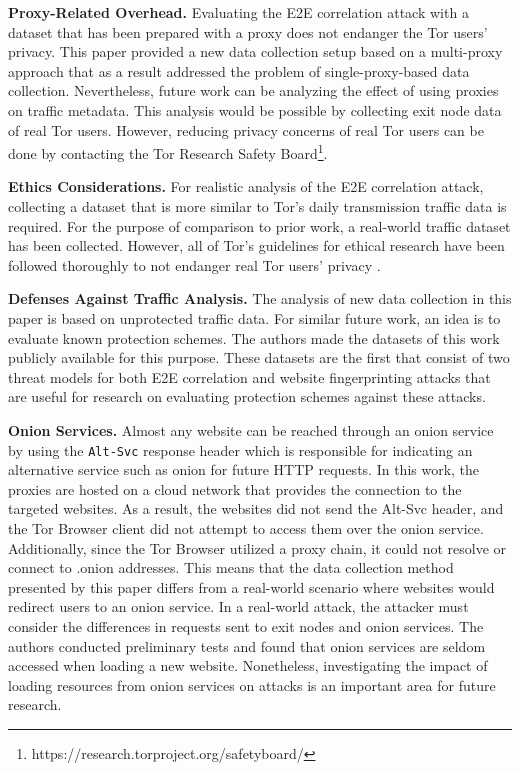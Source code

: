 \documentclass[sigconf]{acmart}
\begin{document}
\vspace{3mm}

\textbf{Proxy-Related Overhead.} Evaluating the E2E correlation attack with a dataset that has been prepared with a proxy does not endanger the Tor users' privacy. This paper provided a new data collection setup based on a multi-proxy approach that as a result addressed the problem of single-proxy-based data collection. Nevertheless, future work can be analyzing the effect of using proxies on traffic metadata. This analysis would be possible by collecting exit node data of real Tor users. However, reducing privacy concerns of real Tor users can be done by contacting the Tor Research Safety Board\footnote{https://research.torproject.org/safetyboard/}.  

\vspace{3mm}

\textbf{Ethics Considerations.} For realistic analysis of the E2E correlation attack, collecting a dataset that is more similar to Tor's daily transmission traffic data is required. For the purpose of comparison to prior work, a real-world traffic dataset has been collected. However, all of Tor's guidelines for ethical research have been followed thoroughly to not endanger real Tor users' privacy \cite{ethicaltorresearch}.

\vspace{3mm}

\textbf{Defenses Against Traffic Analysis.} The analysis of new data collection in this paper is based on unprotected traffic data. For similar future work, an idea is to evaluate known protection schemes. The authors made the datasets of this work publicly available for this purpose. These datasets are the first that consist of two threat models for both E2E correlation and website fingerprinting attacks that are useful for research on evaluating protection schemes against these attacks.

\vspace{3mm}

\textbf{Onion Services.} Almost any website can be reached through an onion service by using the \texttt{Alt-Svc} response header which is responsible for indicating an alternative service such as onion for future HTTP requests. In this work, the proxies are hosted on a cloud network that provides the connection to the targeted websites. As a result, the websites did not send the Alt-Svc header, and the Tor Browser client did not attempt to access them over the onion service. Additionally, since the Tor Browser utilized a proxy chain, it could not resolve or connect to .onion addresses. This means that the data collection method presented by this paper differs from a real-world scenario where websites would redirect users to an onion service. In a real-world attack, the attacker must consider the differences in requests sent to exit nodes and onion services. The authors conducted preliminary tests and found that onion services are seldom accessed when loading a new website. Nonetheless, investigating the impact of loading resources from onion services on attacks is an important area for future research.
\end{document}
